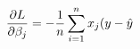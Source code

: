 \documentclass[preview]{standalone}
\begin{document}
\begin{align*}
\special{dvisvgm:raw <g id='unique000'>}\frac{\partial{L}}{\partial\beta_j}=-\frac{1}{n}\sum^n_{i=1}x_j(y-\hat{y}\special{dvisvgm:raw </g>}
\end{align*}
\end{document}
